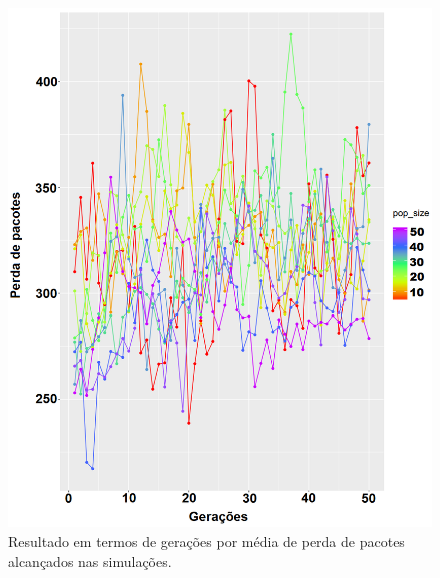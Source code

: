 \documentclass[conference]{IEEEtran}
\begin{document}
\begin{figure}[t]
  \centering
  \includegraphics[scale=0.24]{figures/GeracoesXPerdaPacotes.png}
  \caption{Resultado em termos de gerações por média de perda de pacotes alcançados nas simulações.}
  \label{fig:result-perda}
\end{figure}
\end{document}
